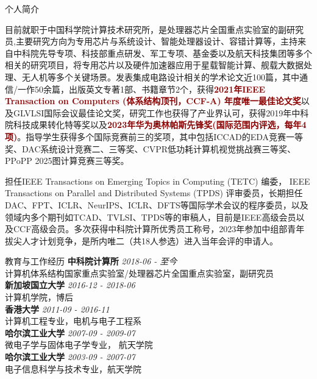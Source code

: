 \documentclass{resume} %
\begin{document}
\begin{rSection}{个人简介}
    \vspace{-1em}
\item 目前就职于中国科学院计算技术研究所，是处理器芯片全国重点实验室的副研究员,主要研究方向为专用芯片与系统设计、智能处理器设计、容错计算等，主持来自中科院先导专项、科技部重点研发、军工专项、基金委以及航天科技集团等多个相关的研究项目，将专用芯片以及硬件加速器应用于星载智能计算、舰载大数据处理、无人机等多个关键场景。发表集成电路设计相关的学术论文近100篇，其中通信/一作50余篇，出版英文专著1部、书籍章节2个，获得\textcolor{darkred}{\textbf{2021年IEEE Transaction on Computers (体系结构顶刊，CCF-A) 年度唯一最佳论文奖}}以及GLVLSI国际会议最佳论文奖，研究工作也获得了产业界认可，获得2019年中科院科技成果转化特等奖以及\textcolor{darkred}{\textbf{2023年华为奥林帕斯先锋奖(国际范围内评选，每年4项)}}。指导学生获得多个国际竞赛前三的奖项，其中包括ICCAD的EDA竞赛一等奖、DAC系统设计竞赛二、三等奖、CVPR低功耗计算机视觉挑战赛三等奖、PPoPP 2025图计算竞赛三等奖。

担任IEEE Transactions on Emerging Topics in Computing (TETC) 编委， IEEE Transactions on Parallel and Distributed Systems (TPDS) 评审委员，长期担任DAC、FPT、ICLR、NeurIPS、ICLR、DFTS等国际学术会议的程序委员，以及领域内多个期刊如TCAD、TVLSI、TPDS等的审稿人，目前是IEEE高级会员以及CCF高级会员。多次获得中科院计算所优秀员工称号，2023年参加中组部青年拔尖人才计划竞争，是所内唯二（共18人参选）进入当年会评的申请人。
    \vspace{-0.5em}
\end{rSection}

\begin{rSection}{教育与工作经历}
{\bf 中科院计算所} \hfill {\em 2018-06 - 至今} \\ 
计算机体系结构国家重点实验室/处理器芯片全国重点实验室，副研究员\\
{\bf 新加坡国立大学} \hfill {\em 2016-12 - 2018-06} \\ 
计算机学院，博后\\
{\bf 香港大学} \hfill {\em 2011-09 - 2016-11} \\ 
计算机工程专业，电机与电子工程系\\
{\bf 哈尔滨工业大学} \hfill {\em 2007-09 - 2009-07} \\
微电子学与固体电子学专业， 航天学院\\
{\bf 哈尔滨工业大学} \hfill {\em 2003-09 - 2007-07} \\
电子信息科学与技术专业，航天学院 \\

\end{rSection}
\end{document}
